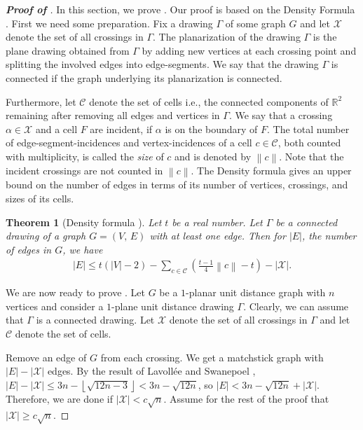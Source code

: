 \documentclass[10pt]{article}
\newcommand{\norm}[1]{\left\lVert#1\right\rVert}
\newtheorem{theorem}{Theorem}
\theoremstyle{definition}
\begin{document}
\begin{proof}[\bf Proof of ] 
In this section, we prove . 
Our proof is based on 
the Density Formula \cite{KKKRSU23}. First we need some preparation.
Fix a drawing $\Gamma$ of some graph $G$ and let $\mathcal{X}$ denote 
the set of all crossings in $\Gamma$. 
The planarization of the drawing $\Gamma$ is the plane drawing obtained from $\Gamma$ 
by adding new vertices at each crossing point and splitting the involved 
edges into edge-segments. We say that the
drawing $\Gamma$ is connected if the graph underlying its planarization is connected.

Furthermore, let $\mathcal{C}$ denote the set of cells i.e., the connected components of $\mathbb{R}^2$ remaining after removing all edges and vertices in $\Gamma$.  We say that a crossing $\alpha \in \mathcal{X}$ and a cell $F$ are incident, if $\alpha$ is on the boundary of $F$. The total number of edge-segment-incidences and vertex-incidences of a cell $c \in \mathcal{C}$, both counted with multiplicity, is called the \emph{size} of $c$ and is denoted by
$\norm{c}$. Note that the incident crossings are not counted in
$\norm{c}$. 
The Density formula gives an upper bound on the number of edges in terms of its number of vertices, crossings, and sizes of its cells.

\begin{theorem} [Density formula {\cite[Lemma 3.1]{KKKRSU23}}] \label{thm_density}
Let $t$ be a real number. Let $\Gamma$ be a connected drawing of a graph $G = (V,\,  E)$ with at least one edge. Then for $|E|$,
the number of edges in $G$, we have
\begin{align}
|E| \leq t(|V|-2) - \sum_{c \in \mathcal{C} }\left( \frac{t-1}{4} \norm{c}-t \right) -|\mathcal{X}|.
\end{align}
\end{theorem}

We are now ready to prove .
Let $G$ be a $1$-planar unit distance graph with $n$ vertices and consider a $1$-plane unit distance drawing $\Gamma$. Clearly, we can assume that $\Gamma$ is a connected drawing.
Let $\mathcal{X}$ denote the set of all crossings in $\Gamma$ and let $\mathcal{C}$ denote the set of cells.

Remove an edge of $G$ from each crossing. We get a matchstick graph 
with $|E|-|\mathcal{X}|$ edges. By the result of Lavoll\'ee and Swanepoel \cite{LS22},  
$|E|-|\mathcal{X}|\le 3n - \left\lfloor\sqrt{12n - 3}\right\rfloor<3n-\sqrt{12n}$, so
$|E|<3n-\sqrt{12n}+|\mathcal{X}|$. Therefore, we are done if $|\mathcal{X}|<c\sqrt{n}$. 
Assume for the rest of the proof that $|\mathcal{X}|\ge c\sqrt{n}$. 


\end{proof}
\end{document}
